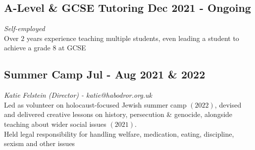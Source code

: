 \documentclass[a4paper,10pt]{article}
\begin{document}
\subsection*{A-Level \& GCSE Tutoring  \hfill Dec 2021 - Ongoing} \textit{Self-employed}\\
Over $2$ years experience teaching multiple students, even leading a student to achieve a grade $8$ at GCSE

\subsection*{Summer Camp \hfill Jul - Aug 2021 \& 2022} \textit{Katie Felstein (Director) - katie@habodror.org.uk}\\
Led as volunteer on holocaust-focused Jewish summer camp $(2022)$, devised and delivered creative lessons on history, persecution \& genocide, alongside teaching about wider social issues $(2021)$.\\
Held legal responsibility for handling welfare, medication, eating, discipline, sexism and other issues
\end{document}
